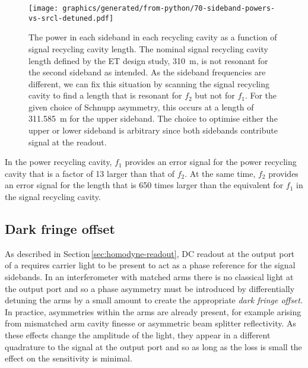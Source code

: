 \begin{figure}
  \centering
  \texttt{[image: graphics/generated/from-python/70-sideband-powers-vs-srcl-detuned.pdf]}
  \caption[Power of the control sidebands in the signal recycling cavity of \ETLF{} in detuned configuration as a function of signal recycling cavity length]{\label{fig:sideband-powers-srcl-detuned}The power in each sideband in each recycling cavity as a function of signal recycling cavity length. The nominal signal recycling cavity length defined by the \gls{ET} design study, \SI{310}{\meter}, is not resonant for the second sideband as intended. As the sideband frequencies are different, we can fix this situation by scanning the signal recycling cavity to find a length that is resonant for $f_2$ but not for $f_1$. For the given choice of Schnupp asymmetry, this occurs at a length of \SI{311.585}{\meter} for the upper sideband. The choice to optimise either the upper or lower sideband is arbitrary since both sidebands contribute signal at the readout.}
\end{figure}

In the power recycling cavity, $f_1$ provides an error signal for the power recycling cavity that is a factor of \num{13} larger than that of $f_2$. At the same time, $f_2$ provides an error signal for the length that is \num{650} times larger than the equivalent for $f_1$ in the signal recycling cavity.

\subsection{Dark fringe offset}
As described in Section\,\ref{sec:homodyne-readout}, \gls{DC} readout at the output port of a \DRFPMI{} requires carrier light to be present to act as a phase reference for the signal sidebands. In an interferometer with matched arms there is no classical light at the output port and so a phase asymmetry must be introduced by differentially detuning the arms by a small amount to create the appropriate \emph{dark fringe offset}. In practice, asymmetries within the arms are already present, for example arising from mismatched arm cavity finesse or asymmetric beam splitter reflectivity. As these effects change the amplitude of the light, they appear in a different quadrature to the signal at the output port and so as long as the loss is small the effect on the sensitivity is minimal.

